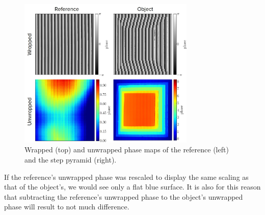 \captionsetup[figure]{width=5in}
\begin{figure}[h!]
	\centering
	\includegraphics[width=0.75\textwidth]{figures/pyramid.jpg}
	\caption[Wrapped and unwrapped phase maps of reference and step pyramid]{Wrapped (top) and unwrapped phase maps of the reference (left) and the step pyramid (right).}
	\label{fig:pyramid}
\end{figure}

If the reference's unwrapped phase was rescaled to display the same scaling as that of the object's, we would see only a flat blue surface. It is also for this reason that subtracting the reference's unwrapped phase to the object's unwrapped phase will result to not much difference.
